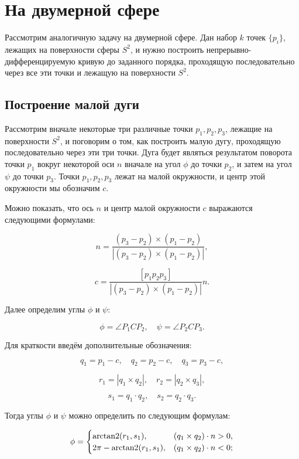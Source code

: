 \section{На двумерной сфере}

Рассмотрим аналогичную задачу на двумерной сфере. Дан набор $k$ точек $\{p_i\}$, лежащих на поверхности сферы $S^2$, и
нужно построить непрерывно-дифференци\-руемую кривую до заданного порядка, проходящую последовательно через все эти
точки и лежащую на поверхности $S^2$.

\subsection*{Построение малой дуги}

Рассмотрим вначале некоторые три различные точки $p_1, p_2, p_3$, лежащие на поверхности $S^2$, и поговорим о
том, как построить малую дугу, проходящую последовательно через эти три точки. Дуга будет являться результатом поворота
точки $p_1$ вокруг некоторой оси $n$ вначале на угол $\phi$ до точки $p_2$, и затем на угол $\psi$ до точки $p_3$.
Точки $p_1, p_2, p_3$ лежат на малой окружности, и центр этой окружности мы обозначим $c$.

Можно показать, что ось $n$ и центр малой окружности $c$ выражаются следующими формулами:

\begin{equation}
n=\frac{(p_3-p_2)\times(p_1-p_2)}{|(p_3-p_2)\times(p_1-p_2)|},
\label{two-dimenstion-sphere-axis}
\end{equation}

$$
c=\frac{[p_1p_2p_3]}{|(p_3-p_2)\times(p_1-p_2)|}n.
$$

Далее определим углы $\phi$ и $\psi$:

$$
\phi=\angle P_1CP_2, \quad \psi=\angle P_2CP_3.
$$

Для краткости введём дополнительные обозначения:

$$
q_1=p_1-c, \quad q_2=p_2-c, \quad q_3=p_3-c,
$$

$$
r_1=|q_1\times q_2|, \quad r_2=|q_2\times q_3|,
$$

$$
s_1=q_1\cdot q_2, \quad s_2=q_2\cdot q_3.
$$

Тогда углы $\phi$ и $\psi$ можно определить по следующим формулам:

\begin{equation}
\phi=
 \begin{cases}
   \operatorname{arctan2}(r_1,s_1),      & (q_1\times q_2)\cdot n>0, \\
   2\pi-\operatorname{arctan2}(r_1,s_1), & (q_1\times q_2)\cdot n<0;
 \end{cases}
\label{two-dimension-sphere-phi-angle}
\end{equation}

